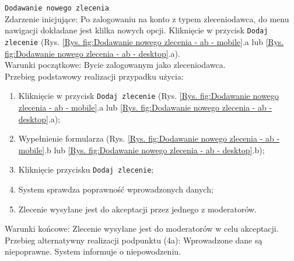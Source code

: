 \texttt{Dodawanie nowego zlecenia} \\
Zdarzenie inicjujące: Po zalogowaniu na konto z typem zleceniodawca, do menu nawigacji dokładane jest klilka nowych opcji. Kliknięcie w przycisk \texttt{Dodaj zlecenie} (Rys. \ref{Rys. fig:Dodawanie nowego zlecenia - ab - mobile}.a lub \ref{Rys. fig:Dodawanie nowego zlecenia - ab - desktop}.a). \\
Warunki początkowe: Bycie zalogowanym jako zleceniodawca. \\
Przebieg podstawowy realizacji przypadku użycia:
\begin{enumerate}
    \item Kliknięcie w przycisk \texttt{Dodaj zlecenie} (Rys. \ref{Rys. fig:Dodawanie nowego zlecenia - ab - mobile}.a lub \ref{Rys. fig:Dodawanie nowego zlecenia - ab - desktop}.a);
    \item Wypełnienie formularza (Rys. \ref{Rys. fig:Dodawanie nowego zlecenia - ab - mobile}.b lub \ref{Rys. fig:Dodawanie nowego zlecenia - ab - desktop}.b);
    \item Kliknięcie przycisku \texttt{Dodaj zlecenie};
    \item System sprawdza poprawność wprowadzonych danych;
    \item Zlecenie wysyłane jest do akceptacji przez jednego z moderatorów.
\end{enumerate}
Warunki końcowe: Zlecenie wysyłane jest do moderatorów w celu akceptacji.
Przebieg alternatywny realizacji podpunktu (4a): Wprowadzone dane są niepoprawne. System informuje o niepowodzeniu. \\
